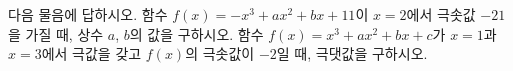 다음 물음에 답하시오.
 함수 $f(x)=-x^3+ax^2+bx+11$이 $x=2$에서 극솟값 $-21$을 가질 때, 상수 $a$, $b$의 값을 구하시오.
 함수 $f(x)=x^3+ax^2+bx+c$가 $x=1$과 $x=3$에서 극값을 갖고 $f(x)$의 극솟값이 $-2$일 때, 극댓값을 구하시오. 
